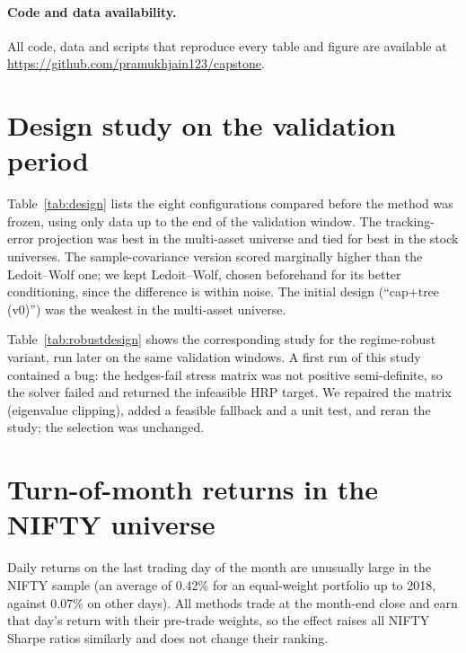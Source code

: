 \documentclass[11pt]{article}
\begin{document}
\paragraph{Code and data availability.} All code, data and scripts that reproduce every
table and figure are available at \url{https://github.com/pramukhjain123/capstone}.




\appendix
\section{Design study on the validation period}\label{app:design}
Table~\ref{tab:design} lists the eight configurations compared before the method was frozen,
using only data up to the end of the validation window. The tracking-error projection was
best in the multi-asset universe and tied for best in the stock universes. The
sample-covariance version scored marginally higher than the Ledoit--Wolf one; we kept
Ledoit--Wolf, chosen beforehand for its better conditioning, since the difference is
within noise. The initial design (``cap+tree (v0)'') was the weakest in the multi-asset
universe.



Table~\ref{tab:robustdesign} shows the corresponding study for the regime-robust variant,
run later on the same validation windows. A first run of this study contained a bug: the
hedges-fail stress matrix was not positive semi-definite, so the solver failed and returned
the infeasible HRP target. We repaired the matrix (eigenvalue clipping), added a feasible
fallback and a unit test, and reran the study; the selection was unchanged.



\section{Turn-of-month returns in the NIFTY universe}
Daily returns on the last trading day of the month are unusually large in the NIFTY sample
(an average of 0.42\% for an equal-weight portfolio up to 2018, against 0.07\% on other
days). All methods trade at the month-end close and earn that day's return with their
pre-trade weights, so the effect raises all NIFTY Sharpe ratios similarly and does not
change their ranking.
\end{document}

